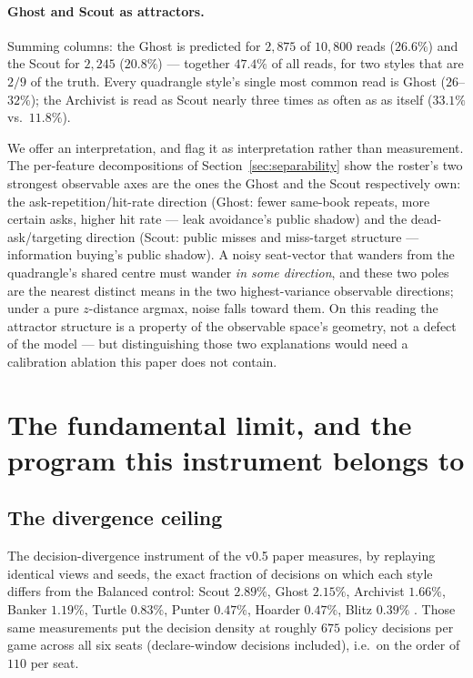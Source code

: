 \documentclass[11pt]{article}
\begin{document}
\paragraph{Ghost and Scout as attractors.} Summing columns: the Ghost is predicted for
$2{,}875$ of $10{,}800$ reads ($26.6\%$) and the Scout for $2{,}245$ ($20.8\%$) ---
together $47.4\%$ of all reads, for two styles that are $2/9$ of the truth. Every quadrangle
style's single most common read is Ghost ($26$--$32\%$); the Archivist is read as Scout
nearly three times as often as as itself ($33.1\%$ vs.\ $11.8\%$).

We offer an interpretation, and flag it as interpretation rather than measurement. The
per-feature decompositions of Section~\ref{sec:separability} show the roster's two strongest
observable axes are the ones the Ghost and the Scout respectively own: the
ask-repetition/hit-rate direction (Ghost: fewer same-book repeats, more certain asks, higher
hit rate --- leak avoidance's public shadow) and the dead-ask/targeting direction (Scout:
public misses and miss-target structure --- information buying's public shadow). A noisy
seat-vector that wanders from the quadrangle's shared centre must wander \emph{in some
direction}, and these two poles are the nearest distinct means in the two highest-variance
observable directions; under a pure $z$-distance argmax, noise falls toward them. On this
reading the attractor structure is a property of the observable space's geometry, not a
defect of the model --- but distinguishing those two explanations would need a calibration
ablation this paper does not contain.

\section{The fundamental limit, and the program this instrument belongs to}
\label{sec:limit}

\subsection{The divergence ceiling}

The decision-divergence instrument of the v0.5 paper \cite{v05,styles} measures, by
replaying identical views and seeds, the exact fraction of decisions on which each style
differs from the Balanced control: Scout $2.89\%$, Ghost $2.15\%$, Archivist $1.66\%$,
Banker $1.19\%$, Turtle $0.83\%$, Punter $0.47\%$, Hoarder $0.47\%$, Blitz $0.39\%$
\cite{styles}. Those same measurements put the decision density at roughly $675$ policy
decisions per game across all six seats (declare-window decisions included), i.e.\ on the
order of $110$ per seat.
\end{document}
